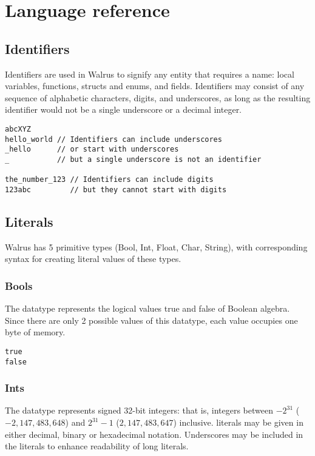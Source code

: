 \chapter{Language reference}\label{chapter:reference}

\section{Identifiers}\label{section:reference:identifiers}
Identifiers are used in Walrus to signify any entity that requires a name:
local variables, functions, structs and enums, and fields.
Identifiers may consist of any sequence of alphabetic characters, digits, and underscores,
as long as the resulting identifier would not be a single underscore or a decimal integer.

\begin{verbatim}
abcXYZ
hello_world // Identifiers can include underscores
_hello      // or start with underscores
_           // but a single underscore is not an identifier

the_number_123 // Identifiers can include digits
123abc         // but they cannot start with digits
\end{verbatim}

\section{Literals}\label{section:reference:Primitive datatypes}
Walrus has 5 primitive types (Bool, Int, Float, Char, String), with corresponding syntax
for creating literal values of these types.

\subsection{Bools}\label{section:reference:bools}
The  datatype represents the logical values true and false of Boolean algebra.
Since there are only 2 possible values of this datatype, each  value occupies
one byte of memory.

\begin{verbatim}
true
false
\end{verbatim}

\subsection{Ints}\label{section:reference:ints}
The  datatype represents signed 32-bit integers:
that is, integers between $-2^{31}$ ($-2,147,483,648$) and $2^{31}-1$ ($2,147,483,647$) inclusive.
 literals may be given in either decimal, binary or hexadecimal notation.
Underscores may be included in the  literals to enhance readability of long literals.

